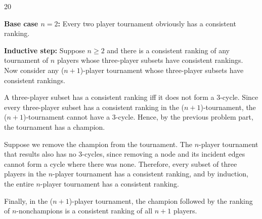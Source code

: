 \documentclass[12pt,twoside]{article}
\begin{document}
\begin{problem} {20}
\begin{problemparts}
{{\bf Base case $n=2$:} Every two player tournament obviously has a
consistent ranking.

{\bf Inductive step:} Suppose $n\geq 2$ and there is a consistent ranking
of any tournament of $n$ players whose three-player subsets have
consistent rankings.  Now consider any ($n+1$)-player tournament whose
three-player subsets have consistent rankings.

A three-player subset has a consistent ranking iff it does not form a 3-cycle. Since every three-player subset has a consistent ranking in the ($n+1$)-tournament, the ($n+1$)-tournament cannot have a 3-cycle. Hence, by the previous problem part, the tournament has a champion.

Suppose we remove the champion from the tournament. The $n$-player tournament that results also has no 3-cycles, since removing a node and its incident edges cannot form a cycle where there was none. Therefore, every subset of three players in the $n$-player tournament has a consistent ranking, and by induction, the entire $n$-player tournament has a consistent ranking.

Finally, in the ($n+1$)-player tournament, the champion followed by the ranking of $n$-nonchampions is a consistent ranking of all $n+1$ players.}

\end{problemparts}

\end{problem}

\fi

\end{document}
